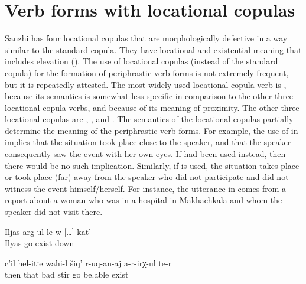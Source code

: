 
\section{Verb forms with locational copulas}
\label{sec:Verb forms with locational copulae}

Sanzhi has four locational copulas that are morphologically defective in a way similar to the standard copula. They have locational and existential meaning that includes elevation (). The use of locational copulas (instead of the standard copula) for the formation of periphrastic verb forms is not extremely frequent, but it is repeatedly attested. The most widely used locational copula verb is  , because its semantics is somewhat less specific in comparison to the other three locational copula verbs, and because of its meaning of proximity. The other three locational copulas are  ,  , and  . The semantics of the locational copulas partially determine the meaning of the periphrastic verb forms. For example, the use of  in  implies that the situation took place close to the speaker, and that the speaker consequently saw the event with her own eyes. If  had been used instead, then there would be no such implication. Similarly, if  is used, the situation takes place or took place (far) away from the speaker who did not participate and did not witness the event himself/herself. For instance, the utterance in  comes from a report about a woman who was in a hospital in Makhachkala and whom the speaker did not visit there.
%
\begin{exe}
	\ex	\label{ex:Ilja is going downwards periphrastic}
	\gll	Iljas	arg-ul	le-w	[\ldots]	kat'\\
		Ilyas	go	exist	{}	down\\
	\glt	{}
	
	\ex	\label{ex:Then, badly like this, she is not able to move}
	\gll	c'il	hel-itːe	wahi-l	šiq'	r-uq-an-aj	a-r-irχ-ul	te-r\\
		then	that\tsc{-advz}	bad	stir	go be.able exist\\
	\glt	{}

\end{exe}

